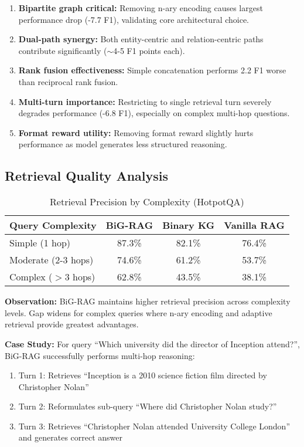 \documentclass[11pt,a4paper]{article}
\begin{document}
\begin{enumerate}
    \item \textbf{Bipartite graph critical:} Removing n-ary encoding causes largest performance drop (-7.7 F1), validating core architectural choice.

    \item \textbf{Dual-path synergy:} Both entity-centric and relation-centric paths contribute significantly ($\sim$4-5 F1 points each).

    \item \textbf{Rank fusion effectiveness:} Simple concatenation performs 2.2 F1 worse than reciprocal rank fusion.

    \item \textbf{Multi-turn importance:} Restricting to single retrieval turn severely degrades performance (-6.8 F1), especially on complex multi-hop questions.

    \item \textbf{Format reward utility:} Removing format reward slightly hurts performance as model generates less structured reasoning.
\end{enumerate}

\subsection{Retrieval Quality Analysis}

\begin{table}[h]
\centering
\caption{Retrieval Precision by Complexity (HotpotQA)}
\begin{tabular}{lccc}
\toprule
\textbf{Query Complexity} & \textbf{BiG-RAG} & \textbf{Binary KG} & \textbf{Vanilla RAG} \\
\midrule
Simple (1 hop) & 87.3\% & 82.1\% & 76.4\% \\
Moderate (2-3 hops) & 74.6\% & 61.2\% & 53.7\% \\
Complex ($>$3 hops) & 62.8\% & 43.5\% & 38.1\% \\
\bottomrule
\end{tabular}
\end{table}

\textbf{Observation:} BiG-RAG maintains higher retrieval precision across complexity levels. Gap widens for complex queries where n-ary encoding and adaptive retrieval provide greatest advantages.

\textbf{Case Study:} For query ``Which university did the director of Inception attend?'', BiG-RAG successfully performs multi-hop reasoning:
\begin{enumerate}
    \item Turn 1: Retrieves ``Inception is a 2010 science fiction film directed by Christopher Nolan''
    \item Turn 2: Reformulates sub-query ``Where did Christopher Nolan study?''
    \item Turn 3: Retrieves ``Christopher Nolan attended University College London'' and generates correct answer
\end{enumerate}
\end{document}

